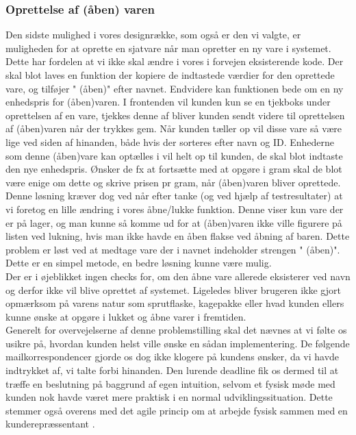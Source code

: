 \documentclass[]{article}
\begin{document}
\subsubsection{Oprettelse af (åben) varen}
Den sidste mulighed i vores designrække, som også er den vi valgte, er muligheden for at oprette en sjatvare når man opretter en ny vare i systemet. Dette har fordelen at vi ikke skal ændre i vores i forvejen eksisterende kode. Der skal blot laves en funktion der kopiere de indtastede værdier for den oprettede vare, og tilføjer " (åben)" efter navnet. Endvidere kan funktionen bede om en ny enhedspris for (åben)varen. I frontenden vil kunden kun se en tjekboks under oprettelsen af en vare, tjekkes denne af bliver kunden sendt videre til oprettelsen af (åben)varen når der trykkes gem. Når kunden tæller op vil disse vare så være lige ved siden af hinanden, både hvis der sorteres efter navn og ID. Enhederne som denne (åben)vare kan optælles i vil helt op til kunden, de skal blot indtaste den nye enhedspris. Ønsker de fx at fortsætte med at opgøre i gram skal de blot være enige om dette og skrive prisen pr gram, når (åben)varen bliver oprettede.\\
\indent Denne løsning kræver dog ved når efter tanke (og ved hjælp af testresultater) at vi foretog en lille ændring i vores åbne/lukke funktion. Denne viser kun vare der er på lager, og man kunne så komme ud for at (åben)varen ikke ville figurere på listen ved lukning, hvis man ikke havde en åben flakse ved åbning af baren. Dette problem er løst ved at medtage vare der i navnet indeholder strengen " (åben)". Dette er en simpel metode, en bedre løsning kunne være mulig. \\
\indent Der er i øjeblikket ingen checks for, om den åbne vare allerede eksisterer ved navn og derfor ikke vil blive oprettet af systemet. Ligeledes bliver brugeren ikke gjort opmærksom på varens natur som sprutflaske, kagepakke eller hvad kunden ellers kunne ønske at opgøre i lukket og åbne varer i fremtiden. \\
\indent Generelt for overvejelserne af denne problemstilling skal det nævnes at vi følte os usikre på, hvordan kunden helst ville ønske en sådan implementering. De følgende mailkorrespondencer gjorde os dog ikke klogere på kundens ønsker, da vi havde indtrykket af, vi talte forbi hinanden. Den lurende deadline fik os dermed til at træffe en beslutning på baggrund af egen intuition, selvom et fysisk møde med kunden nok havde været mere praktisk i en normal udviklingssituation. Dette stemmer også overens med det agile princip om at arbejde fysisk sammen med en kunderepræssentant \cite{martin2006agile}.
\end{document}
